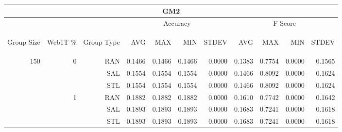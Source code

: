 \begin{center}
\begin{table}[htbp] 
 \begin{center}
\begin{tabular}{ | r | r | r | r | r | r | r | r | r | r | r |}
\hline
\multicolumn{11}{|c|}{GM2}\\
\hline
 & & & \multicolumn{4}{|c|}{Accuracy} & \multicolumn{4}{|c|}{F-Score}\\ \cline{4-11}
\begin{sideways}Group Size\end{sideways} & \begin{sideways}Web1T \%\end{sideways} & \begin{sideways}Group Type\end{sideways} & \begin{sideways}AVG\end{sideways} & \begin{sideways}MAX\end{sideways} & \begin{sideways}MIN\end{sideways} & \begin{sideways}STDEV\end{sideways} & \begin{sideways}AVG\end{sideways} & \begin{sideways}MAX\end{sideways} & \begin{sideways}MIN\end{sideways} & \begin{sideways}STDEV\end{sideways}\\
\hline
\multirow{12}{*}{150}
 & \multirow{3}{*}{0} & RAN & 0.1466 & 0.1466 & 0.1466 & 0.0000 & 0.1383 & 0.7754 & 0.0000 & 0.1565\\ \cline{3-11}
 &   & SAL & 0.1554 & 0.1554 & 0.1554 & 0.0000 & 0.1466 & 0.8092 & 0.0000 & 0.1624\\ \cline{3-11}
 &   & STL & 0.1554 & 0.1554 & 0.1554 & 0.0000 & 0.1466 & 0.8092 & 0.0000 & 0.1624\\ \cline{2-11}
 & \multirow{3}{*}{1} & RAN & 0.1882 & 0.1882 & 0.1882 & 0.0000 & 0.1610 & 0.7742 & 0.0000 & 0.1642\\ \cline{3-11}
 &   & SAL & 0.1893 & 0.1893 & 0.1893 & 0.0000 & 0.1683 & 0.7241 & 0.0000 & 0.1618\\ \cline{3-11}
 &   & STL & 0.1893 & 0.1893 & 0.1893 & 0.0000 & 0.1683 & 0.7241 & 0.0000 & 0.1618\\ \cline{2-11}

\end{tabular}
\end{center}
\end{table}
\end{center}
